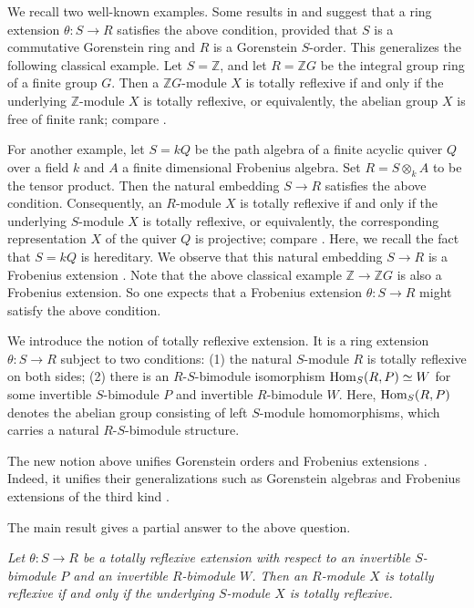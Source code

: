 \documentclass[a4paper]{amsart}
\theoremstyle{definition}
\theoremstyle{remark}
\numberwithin{equation}{section}
\begin{document}
We recall two well-known examples. Some results in \cite[Chapter III]{Aus} and \cite[Section 7]{Buc} suggest that a ring extension $\theta\colon S\rightarrow R$  satisfies the above condition, provided that $S$ is a commutative Gorenstein  ring and $R$ is a Gorenstein $S$-order. This generalizes the following classical example. Let $S=\mathbb{Z}$, and let $R=\mathbb{Z}G$ be the integral group ring of a finite group $G$. Then a $\mathbb{Z}G$-module $X$ is  totally reflexive if and only if the underlying $\mathbb{Z}$-module $X$ is totally reflexive, or equivalently, the abelian group $X$ is  free of finite rank; compare \cite[Section 8]{Buc}.

 For another example, let $S=kQ$ be the path algebra of a finite acyclic quiver $Q$ over a field $k$  and
 $A$ a finite dimensional Frobenius algebra. Set $R=S\otimes_k A$ to be the tensor product. Then the natural embedding $S\rightarrow R$ satisfies the above condition. Consequently, an $R$-module $X$ is totally reflexive if and only if the underlying $S$-module $X$ is totally reflexive, or equivalently, the corresponding representation $X$ of the quiver $Q$ is projective; compare \cite{Ch2, RZ, Wei}. Here, we recall the fact that $S=kQ$ is hereditary. We observe that this natural embedding $S\rightarrow R$  is a Frobenius extension  \cite{NT, Kad}. Note that the above classical example $\mathbb{Z}\rightarrow \mathbb{Z}G$ is also a Frobenius extension. So one expects that a Frobenius extension $\theta\colon S\rightarrow R$ might satisfy the above condition.

 We introduce the notion of totally reflexive extension. It is a ring extension $\theta\colon S\rightarrow R$ subject to two conditions: (1) the natural $S$-module  $R$ is totally reflexive on both sides; (2) there is an $R$-$S$-bimodule isomorphism ${\rm Hom}_S(R, P)\simeq W$ for some invertible $S$-bimodule $P$ and invertible $R$-bimodule $W$. Here, ${\rm Hom}_S(R, P)$ denotes
 the abelian group consisting of left $S$-module homomorphisms, which carries a natural $R$-$S$-bimodule structure.

  The new notion above unifies Gorenstein orders \cite{Aus} and Frobenius extensions \cite{NT}. Indeed, it unifies their generalizations such as Gorenstein algebras \cite{ABr} and Frobenius extensions of the third kind \cite{KS}.

The main result gives a partial answer to the above question.

\vskip 5pt

 {\em Let $\theta\colon S\rightarrow R$ be a totally reflexive extension with respect to an invertible $S$-bimodule $P$ and an invertible $R$-bimodule $W$. Then an $R$-module $X$ is totally reflexive if and only if the underlying $S$-module $X$ is totally reflexive.}
\end{document}
